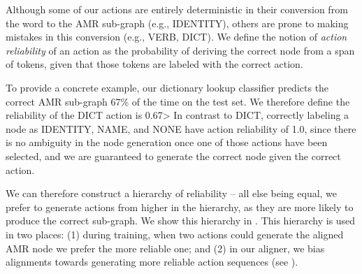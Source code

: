 \documentclass[11pt]{article}
\begin{document}
%
%

Although some of our actions are entirely deterministic in their conversion
  from the word to the AMR sub-graph (e.g., IDENTITY), others are prone to
  making mistakes in this conversion (e.g., VERB, DICT).
We define the notion of \textit{action reliability} of an action as the 
  probability of deriving the correct node from a span of tokens, 
  given that those tokens are labeled with the correct action.

To provide a concrete example, our dictionary lookup classifier predicts the correct
  AMR sub-graph 67\% of the time on the test set.
We therefore define the reliability of the DICT action is 0.67>
In contrast to DICT, correctly labeling a node as IDENTITY, NAME, and NONE have 
  action reliability of 1.0, since there is no ambiguity in the node generation 
  once one of those actions have been selected, 
  and we are guaranteed to generate the correct node given the correct action.


We can therefore construct a hierarchy of reliability -- all else being equal, we
  prefer to generate actions from higher in the hierarchy, as they are more likely
  to produce the correct sub-graph.
We show this hierarchy in .
This hierarchy is used in two places: (1) during training, when two actions could
  generate the aligned AMR node we prefer the more reliable one; and 
  (2) in our aligner, we bias alignments towards generating more reliable action
  sequences (see ).



%
%
\end{document}
